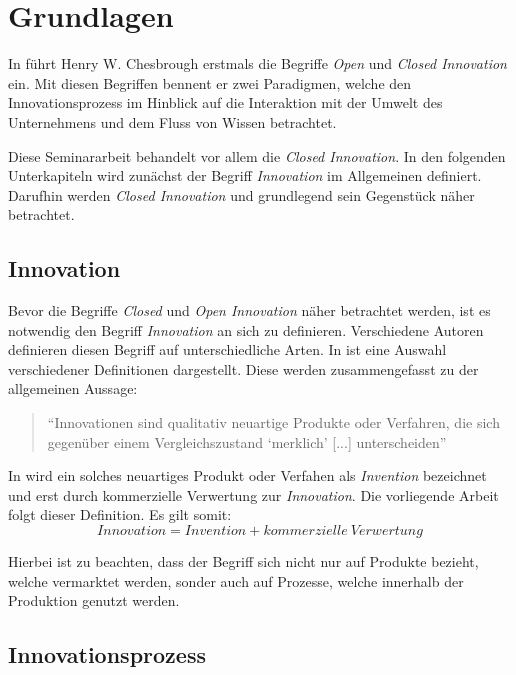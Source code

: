 \section{Grundlagen}\label{sec:grundlagen}
In \cite{chesbrough2003} führt Henry W. Chesbrough erstmals die Begriffe \textit{Open} und
\textit{Closed Innovation} ein.
Mit diesen Begriffen bennent er zwei Paradigmen, welche den Innovationsprozess im Hinblick auf die
Interaktion mit der Umwelt des Unternehmens und dem Fluss von Wissen betrachtet.

Diese Seminararbeit behandelt vor allem die \textit{Closed Innovation}.
In den folgenden Unterkapiteln wird zunächst der Begriff \textit{Innovation} im Allgemeinen definiert.
Darufhin werden \textit{Closed Innovation} und grundlegend sein Gegenstück näher betrachtet.


\subsection{Innovation}\label{sec:grundlagen-inno}
Bevor die Begriffe \textit{Closed} und \textit{Open Innovation} näher betrachtet werden,
ist es notwendig den Begriff \textit{Innovation} an sich zu definieren.
Verschiedene Autoren definieren diesen Begriff auf unterschiedliche Arten.
In \cite[5]{hauschildt2016innovationsmanagement} ist eine Auswahl verschiedener Definitionen dargestellt.
Diese werden zusammengefasst zu der allgemeinen Aussage:
\begin{quote}
    \enquote{Innovationen sind qualitativ neuartige Produkte oder Verfahren,
    die sich gegenüber einem Vergleichszustand \enquote{merklich} [...] unterscheiden}
    \cite[4]{hauschildt2016innovationsmanagement}
\end{quote}

In \cite[9]{herzog2011} wird ein solches neuartiges Produkt oder Verfahen als \textit{Invention} bezeichnet und erst durch kommerzielle Verwertung zur \textit{Innovation}.
Die vorliegende Arbeit folgt dieser Definition.
Es gilt somit:
\begin{equation*}
    Innovation = Invention + kommerzielle~Verwertung
\end{equation*}

Hierbei ist zu beachten, dass der Begriff sich nicht nur auf Produkte bezieht, welche vermarktet werden,
sonder auch auf Prozesse, welche innerhalb der Produktion genutzt werden.

\subsection{Innovationsprozess}\label{sec:grundlagen-prozess}

